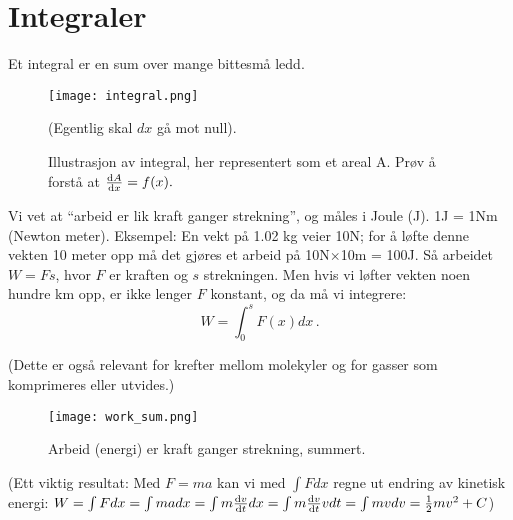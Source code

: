 \documentclass[11pt, A4paper]{article}
\begin{document}
\newpage
\section{Integraler}
Et integral er en sum over mange bittesmå ledd.

\begin{figure}[h]
  \centerline{\texttt{[image: integral.png]}}
  \caption{Illustrasjon av integral, her representert som et areal A. Prøv å forstå at $\dv{A}{x} = f(x).$} (Egentlig skal $dx$ gå mot null).
  \label{fig:interp_example}
\end{figure}


Vi vet at ``arbeid er lik kraft ganger strekning'', og måles i Joule (J). 1J = 1Nm (Newton meter). Eksempel: En vekt på 1.02 kg veier 10N; for å løfte denne vekten 10 meter opp må det gjøres et arbeid på 10N$\times$10m = 100J. Så arbeidet $W=Fs$, hvor $F$ er kraften og $s$ strekningen. Men hvis vi løfter vekten noen hundre km opp, er ikke lenger $F$ konstant, og da må vi integrere:
\begin{equation*}
\label{eq:17}
W=\int_0^s F(x) dx\,.
\end{equation*}

(Dette er også relevant for krefter mellom molekyler og for gasser som komprimeres eller utvides.)


  
\begin{figure}[h]
  \centerline{\texttt{[image: work\_sum.png]}}
  \caption{Arbeid (energi) er kraft ganger strekning, summert.}
  \label{fig:interp_example}
\end{figure}

(Ett viktig resultat: Med $F=ma$ kan vi med $\int Fdx$ regne ut endring av kinetisk energi: 
$W = \int F dx = \int ma dx = \int m \dv{v}{t} dx =\int m \dv{v}{t} v dt = \int m v dv = \frac{1}{2} m v^2 + C$)
\end{document}
